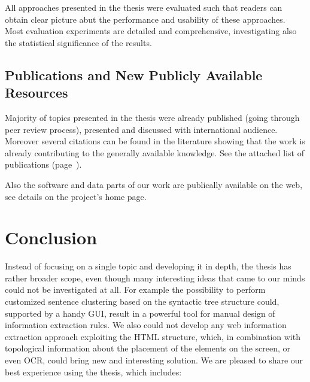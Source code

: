 \documentclass[12pt,a4paper,twoside,notitlepage]{article}
\begin{document}
All approaches presented in the thesis were evaluated such that readers can obtain clear picture abut the performance and usability of these approaches. Most evaluation experiments are detailed and comprehensive, investigating also the statistical significance of the results.

\subsection{Publications and New Publicly Available Resources}

Majority of topics presented in the thesis were already published (going through peer review process), presented and discussed with international audience. Moreover several citations can be found in the literature showing that the work is already contributing to the generally available knowledge. See the attached list of publications (page~\pageref{sec:my_publications}).

Also the software and data parts of our work are publically available on the web, see details on the project's home page.  


\section{Conclusion}

Instead of focusing on a single topic and developing it in depth, the thesis has rather broader scope, even though many interesting ideas that came to our minds could not be investigated at all. For example the possibility to perform customized sentence clustering based on the syntactic tree structure could, supported by a handy GUI, result in a powerful tool for manual design of information extraction rules. We also could not develop any web information extraction approach exploiting the HTML structure, which, in combination with topological information about the placement of the elements on the screen, or even OCR, could bring new and interesting solution. We are pleased to share our best experience using the thesis, which includes:
\end{document}

